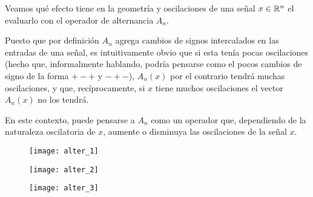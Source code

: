 \begin{ejemplo}
\label{ej: alternado}
Veamos qué efecto tiene en la geometría y oscilaciones
de una señal $x \in \mathbb{R}^{n}$ el evaluarlo con el operador 
de alternancia $A_{n}$.

Puesto que por definición $A_{n}$ agrega cambios de signos
intercalados en las entradas de una señal, es intuitivamente
obvio que si esta tenía pocas oscilaciones (hecho que,
informalmente hablando, podría pensarse como el pocos cambios
de signo de la forma $+-+$ y $-+-$), $A_{n}(x)$ por el contrario
tendrá muchas oscilaciones, y que, recíprocamente,
si $x$ tiene muchos oscilaciones el vector $A_{n}(x)$ no los tendrá.

En este contexto, puede pensarse a $A_{n}$ como un operador
que, dependiendo de la naturaleza oscilatoria de $x$, aumente
o disminuya las oscilaciones de la señal $x$. 

\begin{figure}[H]
	\centering
	\texttt{[image: alter\_1]} 
\end{figure}	

\begin{figure}[H]
	\sidecaption{
	\label{fig: alter 2}
	}
	\centering
	\texttt{[image: alter\_2]} 
\end{figure}	

\begin{figure}[H]
	\centering
	\texttt{[image: alter\_3]} 
\end{figure}	

\end{ejemplo}

